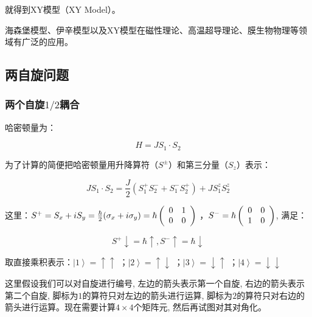 就得到XY模型（XY Model）。


海森堡模型、伊辛模型以及XY模型在磁性理论、高温超导理论、膜生物物理等领域有广泛的应用。

\subsection{两自旋问题}

\subsubsection{两个自旋$1/2$耦合}

哈密顿量为：

\begin{equation}\label{two-spin-half}
  H = J S_1 \cdot S_2
\end{equation}

为了计算的简便把哈密顿量用升降算符（$S^{\pm}$）和第三分量（$S_z$）表示：

\begin{equation}\label{use-raising-lowering-operators}
J S_1 \cdot S_2 = \frac{J}{2} (S_1^+ S_2^- + S_1^-S_2^+) + J S_1^z
S_2^z
\end{equation}


这里：$S^+ = S_x + i S_y = \frac{\hbar}{2} (\sigma_x + i \sigma_y) =
\hbar \left( {\begin{array}{*{20}c}
   0 & 1  \\
   0 & 0  \\
\end{array}} \right)$
，$S^- = \hbar \left( {\begin{array}{*{20}c}
   0 & 0  \\
   1 & 0  \\
\end{array}} \right)$, 满足：


\begin{equation}\label{raising-lowering-property}
 S^+ \downarrow = \hbar \uparrow , S^- \uparrow = \hbar \downarrow
\end{equation}


取直接乘积表示：$\left| 1 \right\rangle = \uparrow \uparrow$
；$\left| 2 \right\rangle = \uparrow \downarrow$ ；$\left| 3
\right\rangle = \downarrow \uparrow$ ；$\left| 4 \right\rangle =
\downarrow \downarrow$

这里假设我们可以对自旋进行编号, 左边的箭头表示第一个自旋,
右边的箭头表示第二个自旋, 脚标为$1$的算符只对左边的箭头进行运算,
脚标为$2$的算符只对右边的箭头进行运算。现在需要计算$4 \times
4$个矩阵元, 然后再试图对其对角化。


